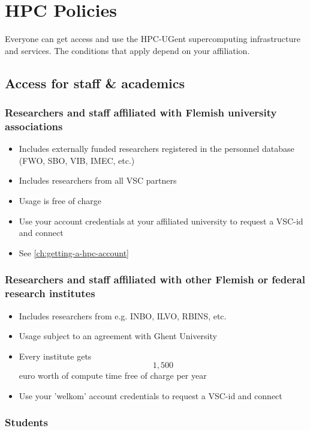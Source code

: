 \chapter{HPC Policies}
\label{ch:hpc-policies}

Everyone can get access and use the HPC-UGent supercomputing infrastructure and services.
The conditions that apply depend on your affiliation.

\section{Access for staff & academics}

\subsection{Researchers and staff affiliated with Flemish university associations}

\begin{itemize}
  \item Includes externally funded researchers registered in the personnel database (FWO, SBO, VIB, IMEC, etc.)
  \item Includes researchers from all VSC partners
  \item Usage is free of charge
  \item Use your account credentials at your affiliated university to request a VSC-id and connect
  \item See \autoref{ch:getting-a-hpc-account}
\end{itemize}


\subsection{Researchers and staff affiliated with other Flemish or federal research institutes}

\begin{itemize}
  \item Includes researchers from e.g. INBO, ILVO, RBINS, etc.
  \item Usage subject to an agreement with Ghent University
  \item Every institute gets $$1,500$$ euro worth of compute time free of charge per year
  \item Use your 'welkom' account credentials to request a VSC-id and connect
\end{itemize}


\subsection{Students}

